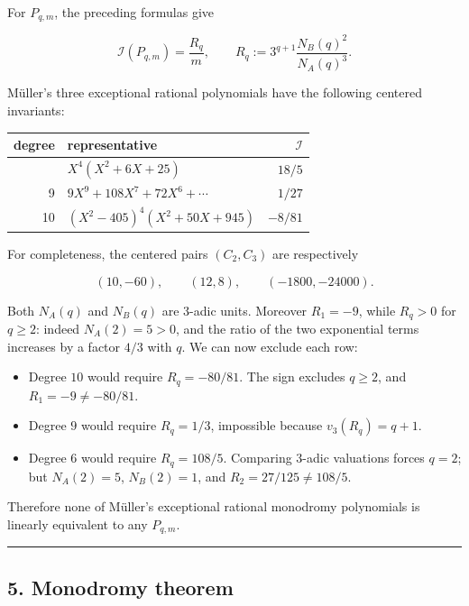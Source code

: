 For \(P_{q,m}\), the preceding formulas give

\[
 \mathcal I(P_{q,m})=\frac{R_q}{m},
 \qquad
 R_q:=3^{q+1}\frac{N_B(q)^2}{N_A(q)^3}.
\]

Müller's three exceptional rational polynomials have the following centered
invariants:

\begin{longtable}[]{@{}rlr@{}}
\toprule\noalign{}
degree & representative & \(\mathcal I\) \\
\midrule\noalign{}
\endhead
\bottomrule\noalign{}
\endlastfoot
6 & \(X^4(X^2+6X+25)\) & \(18/5\) \\
9 & \(9X^9+108X^7+72X^6+\cdots\) & \(1/27\) \\
10 & \((X^2-405)^4(X^2+50X+945)\) & \(-8/81\) \\
\end{longtable}

For completeness, the centered pairs \((C_2,C_3)\) are respectively

\[
 (10,-60),\qquad(12,8),\qquad(-1800,-24000).
\]

Both \(N_A(q)\) and \(N_B(q)\) are 3-adic units. Moreover \(R_1=-9\),
while \(R_q>0\) for \(q\geq2\): indeed \(N_A(2)=5>0\), and the ratio of
the two exponential terms increases by a factor \(4/3\) with \(q\). We can
now exclude each row:

\begin{itemize}
\tightlist
\item
  Degree \(10\) would require \(R_q=-80/81\). The sign excludes
  \(q\geq2\), and \(R_1=-9\ne-80/81\).
\item
  Degree \(9\) would require \(R_q=1/3\), impossible because
  \(v_3(R_q)=q+1\).
\item
  Degree \(6\) would require \(R_q=108/5\). Comparing 3-adic valuations
  forces \(q=2\); but \(N_A(2)=5\), \(N_B(2)=1\), and
  \(R_2=27/125\ne108/5\).
\end{itemize}

Therefore none of Müller's exceptional rational monodromy polynomials is
linearly equivalent to any \(P_{q,m}\).

\begin{center}\rule{0.5\linewidth}{0.5pt}\end{center}

\subsection{5. Monodromy theorem}

